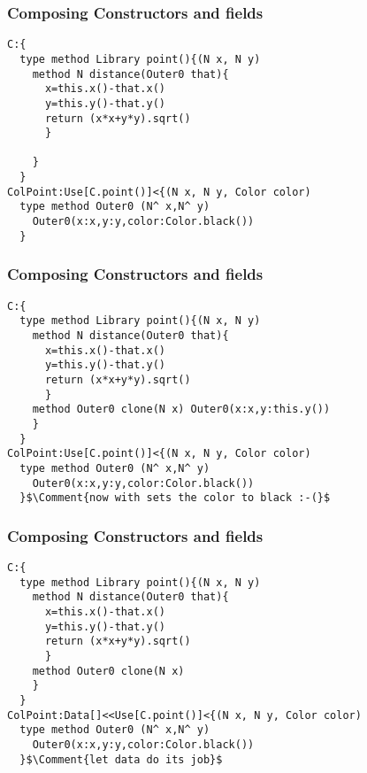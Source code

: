 \begin{frame}[fragile]
\frametitle{Composing Constructors and fields}


\begin{NiceCode}{59ex}{0.9}
\begin{lstlisting}
C:{
  type method Library point(){(N x, N y)
    method N distance(Outer0 that){
      x=this.x()-that.x()
      y=this.y()-that.y()
      return (x*x+y*y).sqrt()
      }

    }
  }
ColPoint:Use[C.point()]<{(N x, N y, Color color)
  type method Outer0 (N^ x,N^ y)
    Outer0(x:x,y:y,color:Color.black())
  }
\end{lstlisting}
\end{NiceCode}
\end{frame}

\begin{frame}[fragile]
\frametitle{Composing Constructors and fields}
\addtocounter{framenumber}{-1}

\begin{NiceCode}{59ex}{0.9}
\begin{lstlisting}
C:{
  type method Library point(){(N x, N y)
    method N distance(Outer0 that){
      x=this.x()-that.x()
      y=this.y()-that.y()
      return (x*x+y*y).sqrt()
      }
    method Outer0 clone(N x) Outer0(x:x,y:this.y())
    }
  }
ColPoint:Use[C.point()]<{(N x, N y, Color color)
  type method Outer0 (N^ x,N^ y)
    Outer0(x:x,y:y,color:Color.black())
  }$\Comment{now with sets the color to black :-(}$
\end{lstlisting}
\end{NiceCode}
\end{frame}

\begin{frame}[fragile]
\frametitle{Composing Constructors and fields}
\addtocounter{framenumber}{-1}

\begin{NiceCode}{59ex}{0.9}
\begin{lstlisting}
C:{
  type method Library point(){(N x, N y)
    method N distance(Outer0 that){
      x=this.x()-that.x()
      y=this.y()-that.y()
      return (x*x+y*y).sqrt()
      }
    method Outer0 clone(N x)
    }
  }
ColPoint:Data[]<<Use[C.point()]<{(N x, N y, Color color)
  type method Outer0 (N^ x,N^ y)
    Outer0(x:x,y:y,color:Color.black())
  }$\Comment{let data do its job}$
\end{lstlisting}
\end{NiceCode}
\end{frame}


